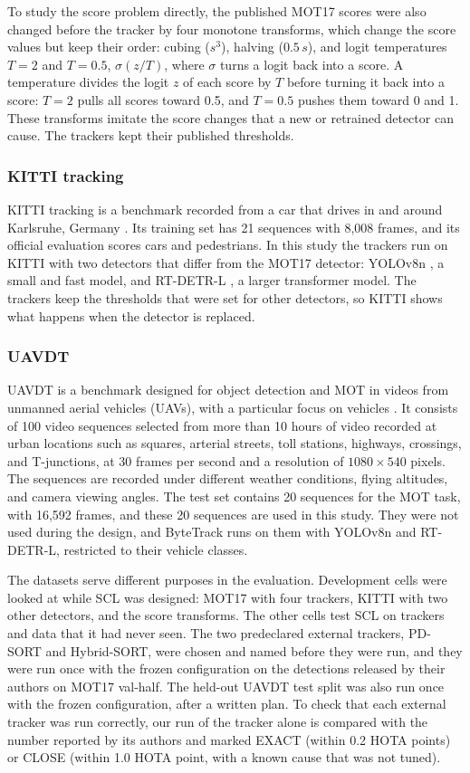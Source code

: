 \documentclass[pdflatex,sn-mathphys-num,iicol]{sn-jnl}
\newcommand{\scl}{SCL}
\begin{document}
To study the score problem directly, the published MOT17 scores were also changed before the
tracker by four monotone transforms, which change the score values but keep their order: cubing
($s^3$), halving ($0.5\,s$), and logit temperatures $T=2$ and $T=0.5$, $\sigma(z/T)$, where
$\sigma$ turns a logit back into a score. A temperature divides the logit $z$ of each score by $T$
before turning it back into a score: $T=2$ pulls all scores toward 0.5, and $T=0.5$ pushes them
toward 0 and 1. These transforms imitate the score changes that a new or retrained detector can
cause. The trackers kept their published thresholds.

\subsubsection{KITTI tracking}
KITTI tracking is a benchmark recorded from a car that drives in and around Karlsruhe, Germany
\cite{geiger2012kitti}. Its training set has 21 sequences with 8,008 frames, and its official
evaluation scores cars and pedestrians. In this study the trackers run on KITTI with two detectors
that differ from the MOT17 detector: YOLOv8n \cite{jocher2023yolov8}, a small and fast model, and
RT-DETR-L \cite{zhao2024rtdetr}, a larger transformer model. The trackers keep the thresholds that
were set for other detectors, so KITTI shows what happens when the detector is replaced.

\subsubsection{UAVDT}
UAVDT is a benchmark designed for object detection and MOT in videos from unmanned aerial
vehicles (UAVs), with a particular focus on vehicles \cite{du2018uavdt}. It consists of 100 video
sequences selected from more than 10 hours of video recorded at urban locations such as squares,
arterial streets, toll stations, highways, crossings, and T-junctions, at 30 frames per second and
a resolution of $1080\times540$ pixels. The sequences are recorded under different weather
conditions, flying altitudes, and camera viewing angles. The test set contains 20 sequences for the
MOT task, with 16,592 frames, and these 20 sequences are used in this study. They were not used
during the design, and ByteTrack runs on them with YOLOv8n and RT-DETR-L, restricted to their
vehicle classes.

The datasets serve different purposes in the evaluation. Development cells were looked at while
\scl{} was designed: MOT17 with four trackers, KITTI with two other detectors, and the score
transforms. The other cells test \scl{} on trackers and data that it had never seen. The two
predeclared external trackers, PD-SORT and Hybrid-SORT, were chosen and named before they were
run, and they were run once with the frozen configuration on the detections released by their
authors on MOT17 val-half. The held-out UAVDT test split was also run once with the frozen
configuration, after a written plan. To check that each external tracker was run correctly, our run
of the tracker alone is compared with the number reported by its authors and marked EXACT (within
0.2 HOTA points) or CLOSE (within 1.0 HOTA point, with a known cause that was not tuned).
\end{document}
